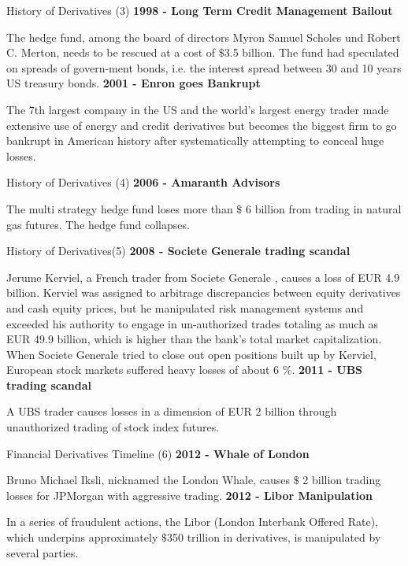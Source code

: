 {History of Derivatives (3)}
\textbf{1998 - Long Term Credit Management Bailout}
  \item The hedge fund, among the board of directors Myron Samuel Scholes und Robert C. Merton, needs to be rescued at a cost of $\$$3.5 billion. The fund had speculated on spreads of govern-ment bonds, i.e. the interest spread between 30 and 10 years US treasury bonds.
\textbf{2001 - Enron goes Bankrupt}
  \item The 7th largest company in the US and the world's largest energy trader made extensive use of energy and credit derivatives but becomes the biggest firm to go bankrupt in American history after systematically attempting to conceal huge losses.

{History of Derivatives (4)}
\textbf{2006 - Amaranth Advisors}
  \item The multi strategy hedge fund loses more than $\$$ 6 billion from trading in natural gas futures. The hedge fund collapses.

{History of Derivatives(5)}
\textbf{2008 - Societe Generale trading scandal}
  \item Jerume Kerviel, a French trader from Societe Generale , causes a loss of EUR 4.9 billion. Kerviel was assigned to arbitrage discrepancies between equity derivatives and cash equity prices, but he manipulated risk management systems and exceeded his authority to engage in un-authorized trades totaling as much as EUR 49.9 billion, which is higher than the bank's total market capitalization. When Societe Generale  tried to close out open positions built up by Kerviel, European stock markets suffered heavy losses of about 6 $\%$.
\textbf{2011 - UBS trading scandal}
  \item A UBS trader causes losses in a dimension of EUR 2 billion through unauthorized trading of stock index futures.

{Financial Derivatives Timeline (6)}
\textbf{2012 - Whale of London}
  \item Bruno Michael Iksli, nicknamed the London Whale, causes $\$$ 2 billion trading losses for JPMorgan with aggressive trading.
\textbf{2012 - Libor Manipulation}
\item In a series of fraudulent actions, the Libor (London Interbank Offered Rate), which underpins approximately $\$$350 trillion in derivatives, is manipulated by several parties.

